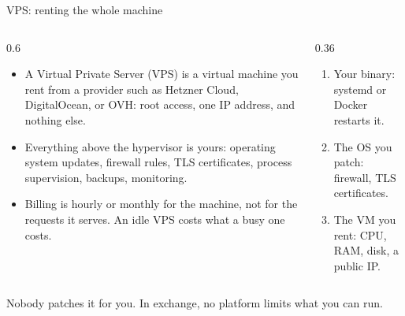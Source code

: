 \documentclass[10pt,aspectratio=169,t]{beamer}
\begin{document}
\begin{frame}[eyebrow=VPS]{VPS: renting the whole machine}
  \begin{columns}[T]
    \begin{column}{0.6\textwidth}
      \begin{itemize}
        \item A Virtual Private Server (VPS) is a virtual machine you rent from a provider such as Hetzner Cloud, DigitalOcean, or OVH: root access, one IP address, and nothing else.
        \item Everything above the hypervisor is yours: operating system updates, firewall rules, TLS certificates, process supervision, backups, monitoring.
        \item Billing is hourly or monthly for the machine, not for the requests it serves. An idle VPS costs what a busy one costs.
      \end{itemize}
    \end{column}
    \begin{column}{0.36\textwidth}
      \begin{enumerate}
        \item Your binary: systemd or Docker restarts it.
        \item The OS you patch: firewall, TLS certificates.
        \item The VM you rent: CPU, RAM, disk, a public IP.
      \end{enumerate}
    \end{column}
  \end{columns}
  \begin{takeaway}{Nobody patches it for you.}
    In exchange, no platform limits what you can run.
  \end{takeaway}
\end{frame}
\end{document}
